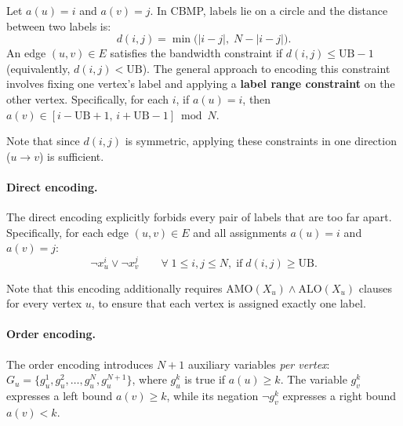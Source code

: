 \documentclass[a4paper,fleqn]{cas-sc}
\begin{document}
        Let $a(u)=i$ and $a(v)=j$. In CBMP, labels lie on a circle and the distance between two labels is:
        \begin{equation}
            d(i,j) = \min\bigl(|i-j|,\; N-|i-j|\bigr).
            \label{eq:cyclic_distance}
        \end{equation}
        An edge $(u,v)\in E$ satisfies the bandwidth constraint if $d(i,j) \le \text{UB}-1$ (equivalently, $d(i,j) < \text{UB}$). The general approach to encoding this constraint involves fixing one vertex's label and applying a \textbf{label range constraint} on the other vertex. Specifically, for each $i$, if $a(u)=i$, then $a(v) \in [i-\text{UB}+1,\, i+\text{UB}-1] \bmod N$.
        
        \vspace{1em}

        Note that since $d(i,j)$ is symmetric, applying these constraints in one direction ($u \to v$) is sufficient. 

        \paragraph{\textbf{Direct encoding.}}
            The direct encoding explicitly forbids every pair of labels that are too far apart. Specifically, for each edge $(u,v)\in E$ and all assignments $a(u)=i$ and $a(v)=j$:
            \begin{equation}
                \neg x_u^i \vee \neg x_v^j \qquad \forall \; 1 \le i,j \le N,\; \text{if} \; d(i,j) \geq \text{UB}.
            \end{equation}

            \vspace{1em}

            Note that this encoding additionally requires $\text{AMO}(X_u) \wedge \text{ALO}(X_u)$ clauses for every vertex $u$, to ensure that each vertex is assigned exactly one label.

        \paragraph{\textbf{Order encoding.}}
            The order encoding introduces $N+1$ auxiliary variables \textit{per vertex}: $G_u=\{g_u^1, g_u^2,\dots, g_u^N, g_u^{N+1}\}$, where $g_u^k$ is true if $a(u) \ge k$. The variable $g_v^k$ expresses a left bound $a(v) \geq k$, while its negation $\neg g_v^k$ expresses a right bound $a(v) < k$.
            
\end{document}
